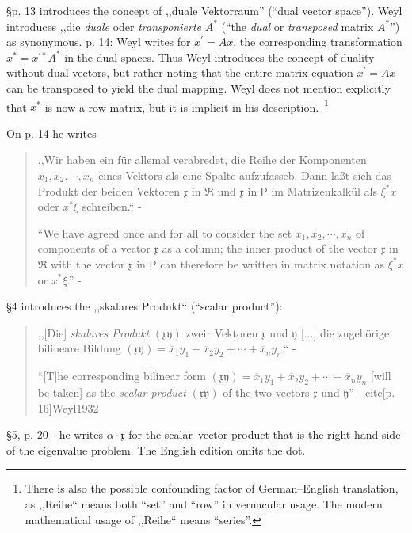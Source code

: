 \S p. 13 introduces the concept of ,,duale Vektorraum'' (``dual vector space'').
Weyl introduces ,,die \textit{duale} oder \textit{transponierte} $A^*$
(``the \textit{dual} or \textit{transposed} matrix $A^*$'')
as synonymous.
p. 14: Weyl writes for $x^\prime = A x$, the corresponding transformation $x^* = x^{\prime *} A^*$
in the dual spaces.
Thus Weyl introduces the concept of duality without dual vectors, but rather noting
that the entire matrix equation $x^\prime = A x$ can be transposed to yield the
dual mapping. Weyl does not mention explicitly that $x^*$ is now a row matrix, but it is
implicit in his description.~\footnote{There is also the possible confounding
factor of German--English translation, as ,,Reihe`` means both ``set'' and ``row''
in vernacular usage. The modern mathematical usage of ,,Reihe`` means ``series''.}

On p. 14 he writes
\begin{quote}
,,Wir haben ein für allemal verabredet, die Reihe der Komponenten $x_1, x_2, \cdots, x_n$
eines Vektors als eine Spalte aufzufasseb. Dann läßt sich das Produkt der beiden
Vektoren $\mathfrak x$ in $\mathfrak R$ und $\mathfrak x$ in $\mathsf P$
im Matrizenkalkül als $\xi^* x$ oder $x^* \xi$ schreiben.`` - \cite[p. 14]{Weyl1928}

``We have agreed once and for all to consider the set
$x_1, x_2, \cdots, x_n$ of components of a vector $\mathfrak x$ as a column; the
inner product of the vector $\mathfrak x$ in $\mathfrak R$ with the vector $\mathfrak x$
in $\mathsf P$ can therefore be written in matrix notation as $\xi^* x$ or $x^* \xi$.''
- \cite[p. 14]{Weyl1931}
\end{quote}

\S 4 introduces the ,,skalares Produkt`` (``scalar product''):
\begin{quote}
,,[Die] \textit{skalares Produkt} $(\mathfrak x \mathfrak y)$ zweir Vektoren
$\mathfrak x$ und $\mathfrak y$ [...] die zugehörige bilineare Bildung
$(\mathfrak x \mathfrak y) = \overline x_1 y_1 + \overline x_2 y_2 + \cdots + \overline x_n y_n $.``
- \cite[p. 15]{Weyl1928}

``[T]he corresponding bilinear form
$(\mathfrak x \mathfrak y) = \overline x_1 y_1 + \overline x_2 y_2 + \cdots + \overline x_n y_n $
[will be taken] as the \textit{scalar product} $(\mathfrak x \mathfrak y)$ of the two vectors
$\mathfrak x$ und $\mathfrak y$'' - cite[p. 16]{Weyl1932}
\end{quote}

\S 5, p. 20 - he writes $\alpha \cdot \mathfrak x$ for the scalar--vector product
that is the right hand side of the eigenvalue problem. The English edition omits the dot.


